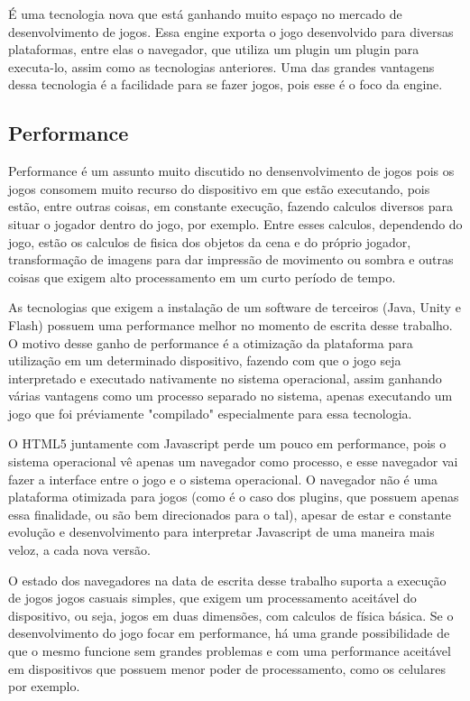 É uma tecnologia nova que está ganhando muito espaço no mercado de
desenvolvimento de jogos. Essa engine exporta o jogo desenvolvido para
diversas plataformas, entre elas o navegador, que utiliza um plugin um
plugin para executa-lo, assim como as tecnologias anteriores.
Uma das grandes vantagens dessa tecnologia é a facilidade para se
fazer jogos, pois esse é o foco da engine.


\subsection{Performance}

Performance é um assunto muito discutido no densenvolvimento de jogos
pois os jogos consomem muito recurso do dispositivo em que estão
executando, pois estão, entre outras coisas, em constante execução, fazendo
calculos diversos para situar o jogador dentro do jogo, por exemplo.
Entre esses calculos, dependendo do jogo, estão os calculos de fisica dos
objetos da cena e do próprio jogador, transformação de imagens para
dar impressão de movimento ou sombra e outras coisas que exigem alto
processamento em um curto período de tempo.

As tecnologias que exigem a instalação de um software de terceiros
(Java, Unity e Flash) possuem uma performance melhor no
momento de escrita desse trabalho. O motivo desse ganho de performance
é a otimização da plataforma para utilização em um determinado
dispositivo, fazendo com que o jogo seja interpretado e executado
nativamente no sistema operacional, assim ganhando várias
vantagens como um processo separado no sistema, apenas executando um
jogo que foi préviamente "compilado" especialmente para essa tecnologia.

O HTML5 juntamente com Javascript perde um pouco em performance, pois
o sistema operacional vê apenas um navegador como processo, e esse
navegador vai fazer a interface entre o jogo e o sistema operacional.
O navegador não é uma plataforma otimizada para jogos (como é o caso
dos plugins, que possuem apenas essa finalidade, ou são bem
direcionados para o tal), apesar de estar e constante evolução e
desenvolvimento para interpretar Javascript de uma maneira mais veloz,
a cada nova versão.

O estado dos navegadores na data de escrita desse
trabalho suporta a execução de jogos jogos casuais simples, que exigem
um processamento aceitável do dispositivo, ou seja, jogos em duas
dimensões, com calculos de física básica. Se o desenvolvimento do jogo
focar em performance, há uma grande possibilidade de que o mesmo
funcione sem grandes problemas e com uma performance aceitável em dispositivos
que possuem menor poder de processamento, como os celulares por exemplo.


